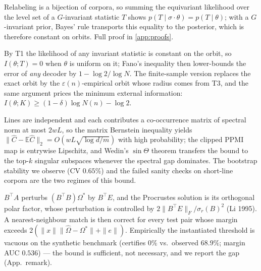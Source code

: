 
\begin{proofsketch}
Relabeling is a bijection of corpora, so summing the equivariant
likelihood over the level set of a $G$-invariant statistic $T$ shows
$p(T\mid\sigma\cdot\theta)=p(T\mid\theta)$; with a $G$-invariant
prior, Bayes' rule transports this equality to the posterior, which is
therefore constant on orbits. Full proof in \cref{app:proofs}.
\end{proofsketch}


\begin{proofsketch}
By T1 the likelihood of any invariant statistic is constant on the
orbit, so $I(\theta;T)=0$ when $\theta$ is uniform on it; Fano's
inequality then lower-bounds the error of \emph{any} decoder by
$1-\log 2/\log N$. The finite-sample version replaces the exact orbit
by the $\varepsilon(n)$-empirical orbit whose radius comes from T3,
and the same argument prices the minimum external information:
$I(\theta;K)\ge(1-\delta)\log N(n)-\log 2$.
\end{proofsketch}

\begin{proofsketch}
Lines are independent and each contributes a co-occurrence matrix of
spectral norm at most $2wL$, so the matrix Bernstein inequality
yields $\|\hat C-\mathbb{E}\hat C\|_2=O(wL\sqrt{\log d/m})$ with high
probability; the clipped PPMI map is entrywise Lipschitz, and Wedin's
$\sin\Theta$ theorem transfers the bound to the top-$k$ singular
subspaces whenever the spectral gap dominates. The bootstrap
stability we observe (CV $0.65\%$) and the failed sanity checks on
short-line corpora are the two regimes of this bound.
\end{proofsketch}

\begin{proofsketch}
$B^{\top}A$ perturbs $(B^{\top}B)\Omega^{*}$ by $B^{\top}E$, and the
Procrustes solution is its orthogonal polar factor, whose
perturbation is controlled by $2\|B^{\top}E\|_F/\sigma_r(B)^2$
(Li 1995). A nearest-neighbour match is then correct for every test
pair whose margin exceeds
$2(\|x\|\|\hat\Omega-\Omega^{*}\|+\|e\|)$. Empirically the
instantiated threshold is vacuous on the synthetic benchmark
(certifies $0\%$ vs.\ observed $68.9\%$; margin AUC $0.536$) --- the
bound is sufficient, not necessary, and we report the gap
(App.~remark).
\end{proofsketch}

